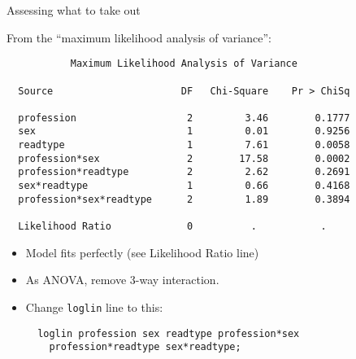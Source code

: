\documentclass[pdf]{prosper}
\begin{document}
\begin{slide}{Assessing what to take out}

From the ``maximum likelihood analysis of variance'':

{\scriptsize
\begin{verbatim}
           Maximum Likelihood Analysis of Variance

  Source                      DF   Chi-Square    Pr > ChiSq

  profession                   2         3.46        0.1777
  sex                          1         0.01        0.9256
  readtype                     1         7.61        0.0058
  profession*sex               2        17.58        0.0002
  profession*readtype          2         2.62        0.2691
  sex*readtype                 1         0.66        0.4168
  profession*sex*readtype      2         1.89        0.3894

  Likelihood Ratio             0          .           .

\end{verbatim}
}

\begin{itemize}
\item Model fits perfectly (see Likelihood Ratio line)
\item As ANOVA, remove 3-way interaction.
\item Change \verb-loglin- line to this:

\begin{verbatim}
  loglin profession sex readtype profession*sex 
    profession*readtype sex*readtype;
\end{verbatim}
\end{itemize}
  
\end{slide}
\end{document}
